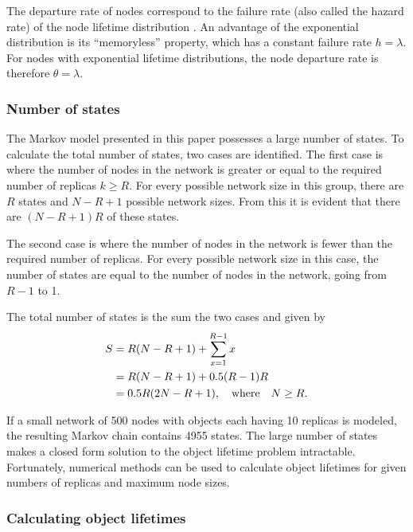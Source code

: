 The departure rate of nodes correspond to the failure rate (also called the hazard rate) of the node lifetime distribution \cite{rausand2004systemreliability}. An advantage of the exponential distribution is its ``memoryless'' property, which has a constant failure rate $h = \lambda$. For nodes with exponential lifetime distributions, the node departure rate is therefore $\theta = \lambda$.

\subsubsection{Number of states}

The Markov model presented in this paper possesses a large number of states. To calculate the total number of states, two cases are identified. The first case is where the number of nodes in the network is greater or equal to the required number of replicas $k \geq R$. For every possible network size in this group, there are $R$ states and $N - R + 1$ possible network sizes. From this it is evident that there are $(N - R + 1)R$ of these states.

The second case is where the number of nodes in the network is fewer than the required number of replicas. For every possible network size in this case, the number of states are equal to the number of nodes in the network, going from $R-1$ to 1.

The total number of states is the sum the two cases and given by
%
\begin{align}
       S & = R(N - R + 1) + \sum_{x=1}^{R-1} x\label{eq_states_num_init}\\
         & = R(N - R + 1) + 0.5 (R - 1) R\notag\\
         & = 0.5 R (2 N - R + 1), \quad\textrm{where}\quad N \geq R. \label{eq_states_num_ans}
\end{align}

If a small network of 500 nodes with objects each having 10 replicas is modeled, the resulting Markov chain contains 4955 states. The large number of states makes a closed form solution to the object lifetime problem intractable. Fortunately, numerical methods can be used to calculate object lifetimes for given numbers of replicas and maximum node sizes.

\subsubsection{Calculating object lifetimes}

